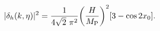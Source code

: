 \begin{equation}
|\delta_{h}(k,\eta)|^2 = \frac{1}{4\sqrt{2}~\pi^2} \biggl(\frac{H}{M_{\rm P}}\biggr)^2[ 3 - \cos{2 x_0}].
\end{equation} 
